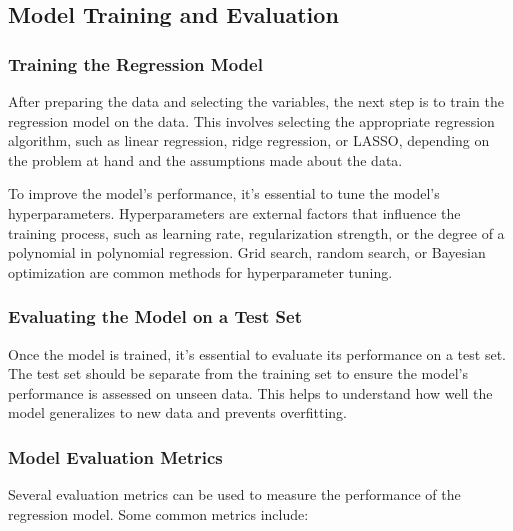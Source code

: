 \documentclass{article}
\begin{document}
\subsection{Model Training and Evaluation}

\subsubsection{Training the Regression Model}
After preparing the data and selecting the variables, the next step is to train the regression model on the data. This involves selecting the appropriate regression algorithm, such as linear regression, ridge regression, or LASSO, depending on the problem at hand and the assumptions made about the data.

To improve the model's performance, it's essential to tune the model's hyperparameters. Hyperparameters are external factors that influence the training process, such as learning rate, regularization strength, or the degree of a polynomial in polynomial regression. Grid search, random search, or Bayesian optimization are common methods for hyperparameter tuning.

\subsubsection{Evaluating the Model on a Test Set}
Once the model is trained, it's essential to evaluate its performance on a test set. The test set should be separate from the training set to ensure the model's performance is assessed on unseen data. This helps to understand how well the model generalizes to new data and prevents overfitting.

\subsubsection{Model Evaluation Metrics}
Several evaluation metrics can be used to measure the performance of the regression model. Some common metrics include:
\end{document}

